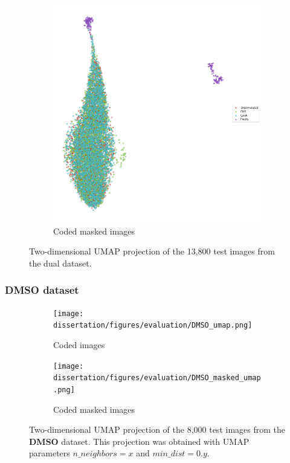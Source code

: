 \begin{figure}[h!]
\begin{subfigure}[h!]{0.45\textwidth}
        \includegraphics[width=\textwidth]{dissertation/figures/CK19_baseline_visualisation.png}
        \caption{Coded masked images}
    \end{subfigure}
    \caption{Two-dimensional UMAP projection of the 13,800 test images from the dual dataset.}
    \label{fig:my_label}
\end{figure}

\bigskip
\subsubsection{DMSO dataset}
\hfill
\hfill

\begin{figure}[h!]
    \centering
    \begin{subfigure}[h!]{0.45\textwidth}
        \texttt{[image: dissertation/figures/evaluation/DMSO\_umap.png]}
        \caption{Coded images}
    \end{subfigure}
    \begin{subfigure}[h!]{0.45\textwidth}
        \texttt{[image: dissertation/figures/evaluation/DMSO\_masked\_umap.png]}
        \caption{Coded masked images}
    \end{subfigure}
    \caption{Two-dimensional UMAP projection of the 8,000 test images from the \textbf{DMSO} dataset. This projection was obtained with UMAP parameters $n\_neighbors=x$ and $min\_dist=0.y$.}
    \label{fig:dmso_projection}
\end{figure}

